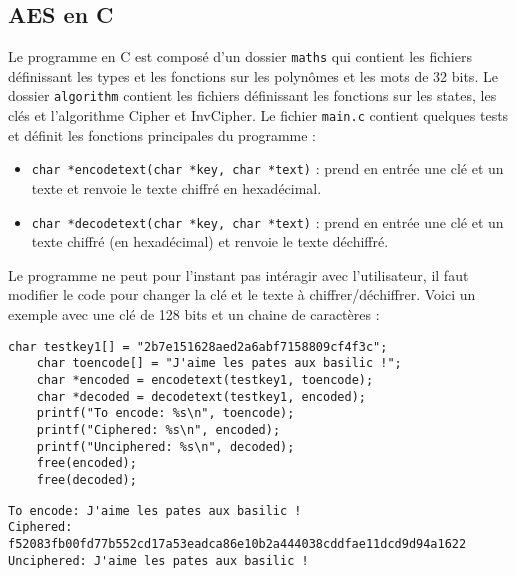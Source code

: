 \documentclass[12pt]{article}
\begin{document}
\subsection{AES en C}
Le programme en C est composé d'un dossier \texttt{maths} qui contient les fichiers définissant les types et les fonctions sur les polynômes et les mots de 32 bits. Le dossier \texttt{algorithm} contient les fichiers définissant les fonctions sur les states, les clés et l'algorithme Cipher et InvCipher. Le fichier \texttt{main.c} contient quelques tests et définit les fonctions principales du programme :
\begin{itemize}
    \item \texttt{char *encodetext(char *key, char *text)} : prend en entrée une clé et un texte et renvoie le texte chiffré en hexadécimal.
    \item \texttt{char *decodetext(char *key, char *text)} : prend en entrée une clé et un texte chiffré (en hexadécimal) et renvoie le texte déchiffré.
\end{itemize}
Le programme ne peut pour l'instant pas intéragir avec l'utilisateur, il faut modifier le code pour changer la clé et le texte à chiffrer/déchiffrer. Voici un exemple avec une clé de 128 bits et un chaine de caractères :
\begin{lstlisting}[caption=Contenu de la fonction \texttt{main},style=CStyle]
    char testkey1[] = "2b7e151628aed2a6abf7158809cf4f3c";
    char toencode[] = "J'aime les pates aux basilic !";
    char *encoded = encodetext(testkey1, toencode);
    char *decoded = decodetext(testkey1, encoded);
    printf("To encode: %s\n", toencode);
    printf("Ciphered: %s\n", encoded);
    printf("Unciphered: %s\n", decoded);
    free(encoded);
    free(decoded);
\end{lstlisting}
\begin{lstlisting}[caption=Résultat de l'exécution du programme \texttt{aes.out},style=CStyleL]
To encode: J'aime les pates aux basilic !
Ciphered: f52083fb00fd77b552cd17a53eadca86e10b2a444038cddfae11dcd9d94a1622
Unciphered: J'aime les pates aux basilic !
\end{lstlisting}
\end{document}
